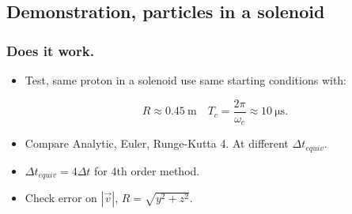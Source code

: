 \documentclass{beamer}
\begin{document}
\subsection{Demonstration, particles in a solenoid}

\begin{frame}
\frametitle{Does it work.}
\begin{itemize}

\item<1-> Test, same proton in a solenoid use same starting conditions with:

\begin{equation*}
R \approx  \SI{0.45}{\meter} \quad T_c=\frac{2\pi}{\omega_c} \approx \SI{10}{\micro\second}.
\end{equation*}

\item<2-> Compare Analytic, Euler, Runge-Kutta 4. At different $\Delta t_{equiv}$.

\item<3-> $\Delta t_{equiv}=4\Delta t$ for 4th order method.

\item<4-> Check error on $|\vec{v}|$, $R=\sqrt{y^2+z^2}$.

\end{itemize}
\end{frame}


\makeatletter
{}
\makeatother
\end{document}
